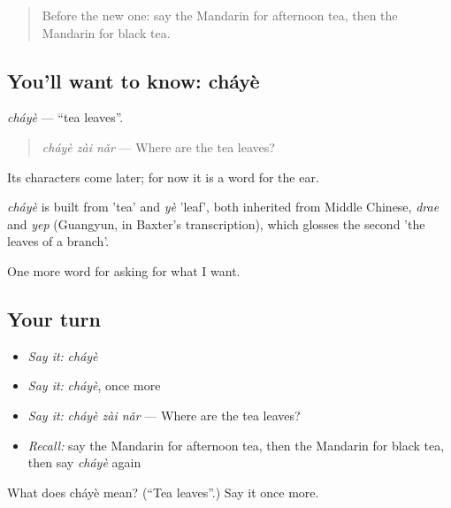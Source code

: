 \label{lesson:ZH-C166-chaye}



\begin{quote}
Before the new one: say the Mandarin for afternoon tea, then the Mandarin for black tea.
\end{quote}

\subsection*{You'll want to know: cháyè}
\emph{cháyè} — \textquotedblleft{}tea leaves\textquotedblright{}.

\begin{quote}
\emph{cháyè zài nǎr} — Where are the tea leaves?
\end{quote}

Its characters come later; for now it is a word for the ear.

\begin{cousinweb}
\emph{cháyè} is built from  'tea' and \emph{yè} 'leaf', both inherited from Middle Chinese, \emph{drae} and \emph{yep} (Guangyun, in Baxter's transcription), which glosses the second 'the leaves of a branch'.
\end{cousinweb}

\begin{grammarlens}[title={What you've built}]
One more word for asking for what I want.
\end{grammarlens}

\subsection*{Your turn}
\begin{itemize}
\raggedright
  \item \emph{Say it:} \emph{cháyè}
  \item \emph{Say it:} \emph{cháyè}, once more
  \item \emph{Say it:} \emph{cháyè zài nǎr} — Where are the tea leaves?
  \item \emph{Recall:} say the Mandarin for afternoon tea, then the Mandarin for black tea, then say \emph{cháyè} again
\end{itemize}

\begin{tcolorbox}[breakable,colback=teal!4,colframe=teal!35!black,title={Before you move on}]
What does cháyè mean? (\textquotedblleft{}Tea leaves\textquotedblright{}.) Say it once more.
\end{tcolorbox}
